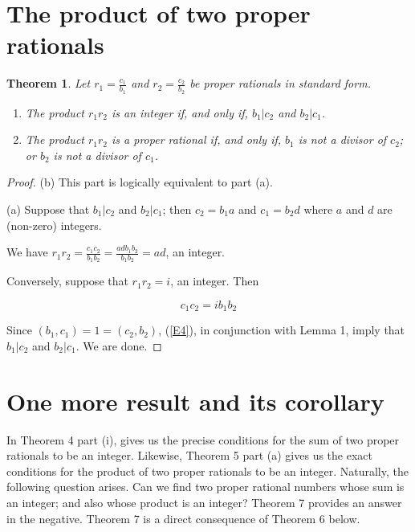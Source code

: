 \documentclass[12pt]{article}
\newtheorem{theorem}{Theorem}
\begin{document}
\section{The product of two proper rationals}

\begin{theorem} Let $r_1 = \frac{c_1}{b_1}$ and $r_2 = \frac{c_2}{b_2}$ be
  proper rationals in standard form.

\begin{enumerate}
\item[(a)]The product $r_1r_2$ is an integer if, and only if, $b_1|c_2$ and
  $b_2|c_1$.

\item[(b)] The product $r_1r_2$ is a proper rational if, and only if, $b_1$ is
  not a divisor of $c_2$; or $b_2$ is not a divisor of $c_1$.
\end{enumerate}
\end{theorem}

\begin{proof} (b) This part is logically equivalent to part (a).

\noindent (a) Suppose that $b_1|c_2$ and $b_2|c_1$; then $c_2=b_1a$ and
$c_1=b_2d$ where $a$ and $d$ are (non-zero) integers.

We have $r_1r_2 = \frac{c_1c_2}{b_1b_2} = \frac{adb_1 b_2}{b_1b_2} = ad$, an
integer.  

Conversely, suppose that $r_1r_2=i$, an integer.  Then

\begin{equation}
c_1c_2 = ib_1b_2 \label{E4}
\end{equation}

Since $(b_1,c_1) = 1 = (c_2,b_2)$, (\ref{E4}), in conjunction with Lemma 1,
imply that $b_1|c_2$ and $b_2|c_1$.  We are done.  \end{proof}

\section{ One more result and its corollary}

In Theorem 4 part (i), gives us the precise conditions for the sum of two
proper rationals to be an integer. Likewise, Theorem 5 part (a) gives us the
exact conditions for the product of two proper rationals to be an
integer. Naturally, the following question arises.  Can we find two proper
rational numbers whose sum is an integer; and also whose product is an
integer?  Theorem 7 provides an answer in the negative. Theorem 7 is a direct
consequence of Theorem 6 below.
\end{document}
